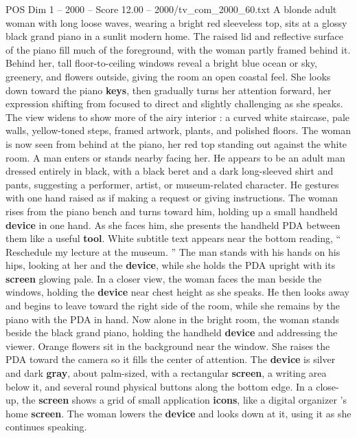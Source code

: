 \begin{textsample}{POS Dim 1 – 2000 – Score 12.00 – 2000/tv\_com\_2000\_60.txt}  \label{ex:f1_pos_038}
A blonde adult woman with long loose waves, wearing a bright red sleeveless top, sits at a glossy black grand piano in a sunlit modern home.
The raised lid and reflective surface of the piano fill much of the foreground, with the woman partly framed behind it.
Behind her, tall floor-to-ceiling windows reveal a bright blue ocean or sky, greenery, and flowers outside, giving the room an open coastal feel.
She looks down toward the piano \textbf{keys}, then gradually turns her attention forward, her expression shifting from focused to direct and slightly challenging as she speaks.
The view widens to show more of the airy interior : a curved white staircase, pale walls, yellow-toned steps, framed artwork, plants, and polished floors.
The woman is now seen from behind at the piano, her red top standing out against the white room.
A man enters or stands nearby facing her.
He appears to be an adult man dressed entirely in black, with a black beret and a dark long-sleeved shirt and pants, suggesting a performer, artist, or museum-related character.
He gestures with one hand raised as if making a request or giving instructions.
The woman rises from the piano bench and turns toward him, holding up a small handheld \textbf{device} in one hand.
As she faces him, she presents the handheld PDA between them like a useful \textbf{tool}.
White subtitle text appears near the bottom reading, “ Reschedule my lecture at the museum. ” The man stands with his hands on his hips, looking at her and the \textbf{device}, while she holds the PDA upright with its \textbf{screen} glowing pale.
In a closer view, the woman faces the man beside the windows, holding the \textbf{device} near chest height as she speaks.
He then looks away and begins to leave toward the right side of the room, while she remains by the piano with the PDA in hand.
Now alone in the bright room, the woman stands beside the black grand piano, holding the handheld \textbf{device} and addressing the viewer.
Orange flowers sit in the background near the window.
She raises the PDA toward the camera so it fills the center of attention.
The \textbf{device} is silver and dark \textbf{gray}, about palm-sized, with a rectangular \textbf{screen}, a writing area below it, and several round physical buttons along the bottom edge.
In a close-up, the \textbf{screen} shows a grid of small application \textbf{icons}, like a digital organizer ’s home \textbf{screen}.
The woman lowers the \textbf{device} and looks down at it, using it as she continues speaking.

\end{textsample}
